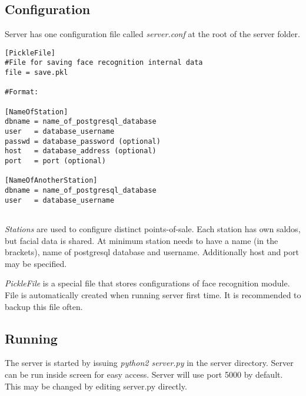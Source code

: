 \documentclass[11pt]{article}
\begin{document}
\subsection{Configuration}
Server has one configuration file called \emph{server.conf} at the root of the server folder.
\begin{verbatim}
[PickleFile]
#File for saving face recognition internal data
file = save.pkl

#Format:

[NameOfStation]
dbname = name_of_postgresql_database
user   = database_username
passwd = database_password (optional)
host   = database_address (optional)
port   = port (optional)

[NameOfAnotherStation]
dbname = name_of_postgresql_database
user   = database_username


\end{verbatim}
\emph{Stations} are used to configure distinct points-of-sale. Each station has own saldos, but facial data is shared.
At minimum station needs to have a name (in the brackets), name of postgresql database and username. Additionally
host and port may be specified.

\emph{PickleFile} is a special file that stores configurations of face recognition module. File is automatically created
when running server first time. It is recommended to backup this file often.
\subsection{Running}
The server is started by issuing \emph{python2 server.py} in the server directory. Server can be run inside screen for
easy access. Server will use port 5000 by default. This may be changed by editing server.py directly.
\end{document}
